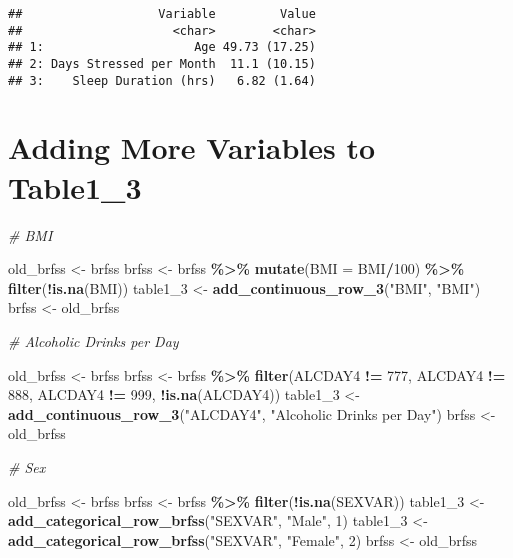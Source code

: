 \documentclass[
]{article}
\newenvironment{Shaded}{\begin{snugshade}}{\end{snugshade}}
\newcommand{\AttributeTok}[1]{\textcolor[rgb]{0.13,0.29,0.53}{#1}}
\newcommand{\CommentTok}[1]{\textcolor[rgb]{0.56,0.35,0.01}{\textit{#1}}}
\newcommand{\DecValTok}[1]{\textcolor[rgb]{0.00,0.00,0.81}{#1}}
\newcommand{\FunctionTok}[1]{\textcolor[rgb]{0.13,0.29,0.53}{\textbf{#1}}}
\newcommand{\NormalTok}[1]{#1}
\newcommand{\OtherTok}[1]{\textcolor[rgb]{0.56,0.35,0.01}{#1}}
\newcommand{\SpecialCharTok}[1]{\textcolor[rgb]{0.81,0.36,0.00}{\textbf{#1}}}
\newcommand{\StringTok}[1]{\textcolor[rgb]{0.31,0.60,0.02}{#1}}
\begin{document}
\begin{verbatim}
##                   Variable         Value
##                     <char>        <char>
## 1:                     Age 49.73 (17.25)
## 2: Days Stressed per Month  11.1 (10.15)
## 3:    Sleep Duration (hrs)   6.82 (1.64)
\end{verbatim}

\section{Adding More Variables to
Table1\_3}\label{adding-more-variables-to-table1_3}

\begin{Shaded}
\begin{Highlighting}[]
\CommentTok{\# BMI}

\NormalTok{old\_brfss }\OtherTok{\textless{}{-}}\NormalTok{ brfss}
\NormalTok{brfss }\OtherTok{\textless{}{-}}\NormalTok{ brfss }\SpecialCharTok{\%\textgreater{}\%} 
  \FunctionTok{mutate}\NormalTok{(}\AttributeTok{BMI =}\NormalTok{ BMI}\SpecialCharTok{/}\DecValTok{100}\NormalTok{) }\SpecialCharTok{\%\textgreater{}\%} 
  \FunctionTok{filter}\NormalTok{(}\SpecialCharTok{!}\FunctionTok{is.na}\NormalTok{(BMI))}
\NormalTok{table1\_3 }\OtherTok{\textless{}{-}} \FunctionTok{add\_continuous\_row\_3}\NormalTok{(}\StringTok{"BMI"}\NormalTok{, }\StringTok{"BMI"}\NormalTok{)}
\NormalTok{brfss }\OtherTok{\textless{}{-}}\NormalTok{ old\_brfss}

\CommentTok{\# Alcoholic Drinks per Day}

\NormalTok{old\_brfss }\OtherTok{\textless{}{-}}\NormalTok{ brfss}
\NormalTok{brfss }\OtherTok{\textless{}{-}}\NormalTok{ brfss }\SpecialCharTok{\%\textgreater{}\%} 
  \FunctionTok{filter}\NormalTok{(ALCDAY4 }\SpecialCharTok{!=} \DecValTok{777}\NormalTok{, ALCDAY4 }\SpecialCharTok{!=} \DecValTok{888}\NormalTok{, ALCDAY4 }\SpecialCharTok{!=} \DecValTok{999}\NormalTok{, }\SpecialCharTok{!}\FunctionTok{is.na}\NormalTok{(ALCDAY4))}
\NormalTok{table1\_3 }\OtherTok{\textless{}{-}} \FunctionTok{add\_continuous\_row\_3}\NormalTok{(}\StringTok{"ALCDAY4"}\NormalTok{, }\StringTok{"Alcoholic Drinks per Day"}\NormalTok{)}
\NormalTok{brfss }\OtherTok{\textless{}{-}}\NormalTok{ old\_brfss}

\CommentTok{\# Sex}

\NormalTok{old\_brfss }\OtherTok{\textless{}{-}}\NormalTok{ brfss}
\NormalTok{brfss }\OtherTok{\textless{}{-}}\NormalTok{ brfss }\SpecialCharTok{\%\textgreater{}\%} \FunctionTok{filter}\NormalTok{(}\SpecialCharTok{!}\FunctionTok{is.na}\NormalTok{(SEXVAR))}
\NormalTok{table1\_3 }\OtherTok{\textless{}{-}} \FunctionTok{add\_categorical\_row\_brfss}\NormalTok{(}\StringTok{"SEXVAR"}\NormalTok{, }\StringTok{"Male"}\NormalTok{, }\DecValTok{1}\NormalTok{)}
\NormalTok{table1\_3 }\OtherTok{\textless{}{-}} \FunctionTok{add\_categorical\_row\_brfss}\NormalTok{(}\StringTok{"SEXVAR"}\NormalTok{, }\StringTok{"Female"}\NormalTok{, }\DecValTok{2}\NormalTok{)}
\NormalTok{brfss }\OtherTok{\textless{}{-}}\NormalTok{ old\_brfss}


\end{Highlighting}
\end{Shaded}
\end{document}

